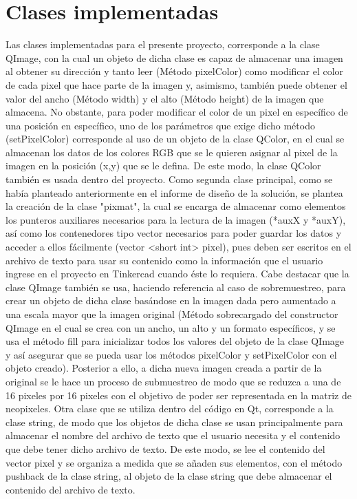 \documentclass{article}
\begin{document}
\section{Clases implementadas}
Las clases implementadas para el presente proyecto, corresponde a la clase QImage, con la cual un objeto de dicha clase es capaz de almacenar una imagen al obtener su dirección y tanto leer (Método pixelColor) como modificar el color de cada pixel que hace parte de la imagen y, asimismo, también puede obtener el valor del ancho (Método width) y el alto (Método height) de la imagen que almacena. No obstante, para poder modificar el color de un pixel en específico de una posición en específico, uno de los parámetros que exige dicho método (setPixelColor) corresponde al uso de un objeto de la clase QColor, en el cual se almacenan los datos de los colores RGB que se le quieren asignar al pixel de la imagen en la posición (x,y) que se le defina. De este modo, la clase QColor también es usada dentro del proyecto. Como segunda clase principal, como se había planteado anteriormente en el informe de diseño de la solución, se plantea la creación de la clase "pixmat", la cual se encarga de almacenar como elementos los punteros auxiliares necesarios para la lectura de la imagen (*auxX y *auxY), así como los contenedores tipo vector necesarios para poder guardar los datos y acceder a ellos fácilmente (vector <short int> pixel), pues deben ser escritos en el archivo de texto para usar su contenido como la información que el usuario ingrese en el proyecto en Tinkercad cuando éste lo requiera.
Cabe destacar que la clase QImage también se usa, haciendo referencia al caso de sobremuestreo, para crear un objeto de dicha clase basándose en la imagen dada pero aumentado a una escala mayor que la imagen original (Método sobrecargado del constructor QImage en el cual se crea con un ancho, un alto y un formato específicos, y se usa el método fill para inicializar todos los valores del objeto de la clase QImage y así asegurar que se pueda usar los métodos pixelColor y setPixelColor con el objeto creado). Posterior a ello, a dicha nueva imagen creada a partir de la original se le hace un proceso de submuestreo de modo que se reduzca a una de 16 pixeles por 16 pixeles con el objetivo de poder ser representada en la matriz de neopixeles.
Otra clase que se utiliza dentro del código en Qt, corresponde a la clase string, de modo que los objetos de dicha clase se usan principalmente para almacenar el nombre del archivo de texto que el usuario necesita y el contenido que debe tener dicho archivo de texto. De este modo, se lee el contenido del vector pixel y se organiza a medida que se añaden sus elementos, con el método pushback de la clase string, al objeto de la clase string que debe almacenar el contenido del archivo de texto.
\end{document}
